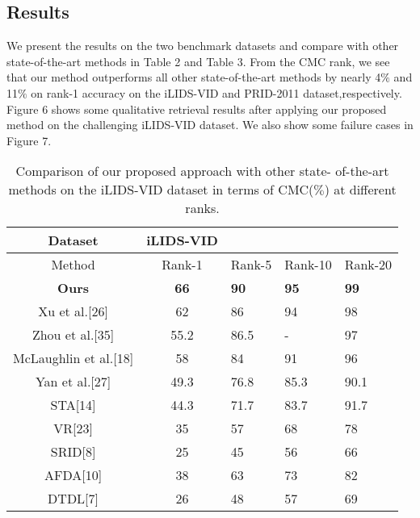 \documentclass[sigconf, authordraft,review=false]{acmart}
\begin{document}
\subsection{Results}
We present the results on the two benchmark datasets
and compare with other state-of-the-art methods in Table 2
and Table 3. From  the  CMC  rank,  we  see  that
our method outperforms all other state-of-the-art methods by nearly 4\(\%\) and 11\(\%\) on rank-1 accuracy on the iLIDS-VID and PRID-2011 dataset,respectively. Figure 6 shows some qualitative retrieval results after applying  our  proposed  method  on  the  challenging  iLIDS-VID dataset. We also show some failure cases in Figure 7. 

\begin{table}[h]
  \caption{Comparison of our proposed approach with other state-
of-the-art methods on the iLIDS-VID dataset in terms of CMC(\(\%\))
at different ranks.}
  \label{tab:freq}
  \begin{tabular}{cclll}
    \toprule
    Dataset&iLIDS-VID\\
    \midrule
    Method & Rank-1& Rank-5& Rank-10& Rank-20\\
   \textbf{ Ours} & \textbf{66}& \textbf{90}& \textbf{95}& \textbf{99}\\
    Xu et al.[26] & 62& 86& 94& 98\\
    Zhou et al.[35] & 55.2& 86.5& -& 97\\
    McLaughlin et al.[18] &58&84& 91& 96\\
    Yan et al.[27] & 49.3& 76.8& 85.3& 90.1\\
    STA[14] & 44.3&71.7&83.7 & 91.7\\
    VR[23] &35& 57& 68&78\\
    SRID[8]& 25& 45& 56& 66\\
    AFDA[10] &38& 63&73& 82\\
    DTDL[7] & 26&48& 57& 69\\
    

\end{tabular}
\end{table}
\end{document}
